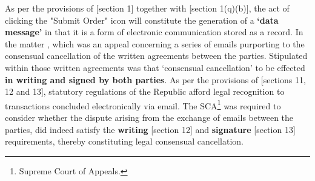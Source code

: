 \documentclass[11pt]{article}
\begin{document}
As per the provisions of [section 1]\cite{rsa02_elect_comm_trans_act} together
with [section 1(q)(b)]\cite{rsa12_elect_comm_trans_amend_bill}, the act of
clicking the "Submit Order" icon will constitute the generation of a \textbf{`data
message'} in that it is a form of electronic communication stored as a record.
In the matter 
\cite{Cachalia15_spring_forest_v_wilberry}, which was an appeal concerning a
series of emails purporting to the consensual cancellation of the written
agreements between the parties. Stipulated within those written agreements was
that `consensual cancellation' to be effected \textbf{in writing and signed by both
parties}. As per the provisions of [sections 11, 12 and
13]\cite{rsa02_elect_comm_trans_act}, statutory regulations of the Republic afford
legal recognition to transactions concluded electronically via email. The
SCA\footnote{Supreme Court of Appeals.} was required to consider whether the dispute
arising from the exchange of emails between the parties, did indeed satisfy the
\textbf{writing} [section 12]\cite{rsa02_elect_comm_trans_act} and \textbf{signature} [section
13]\cite{rsa02_elect_comm_trans_act} requirements, thereby constituting legal
consensual cancellation.\\
\end{document}
